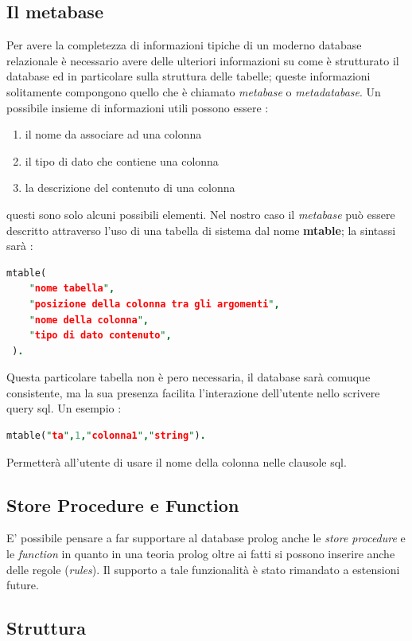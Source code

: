 \subsection{Il metabase}
Per avere la completezza di informazioni tipiche di un moderno database relazionale è necessario avere delle ulteriori informazioni su come è strutturato il database ed in particolare sulla struttura delle tabelle; queste informazioni solitamente compongono quello che è chiamato \emph{metabase} o \emph{metadatabase}. Un possibile insieme di informazioni utili possono essere : 
\begin{enumerate}
\item il nome da associare ad una colonna
\item il tipo di dato che contiene una colonna
\item la descrizione del contenuto di una colonna 
\end{enumerate}
questi sono solo alcuni possibili elementi. Nel nostro caso il \emph{metabase} può essere descritto attraverso l'uso di una tabella di sistema dal nome {\bf mtable}; la sintassi sarà : 
\begin{lstlisting}[language=Prolog,showstringspaces=false]
 mtable(
	"nome tabella",
	"posizione della colonna tra gli argomenti",
	"nome della colonna",
	"tipo di dato contenuto",
 ).
\end{lstlisting}
Questa particolare tabella non è pero necessaria, il database sarà comuque consistente, ma la sua presenza facilita l'interazione dell'utente nello scrivere query sql. Un esempio :
\begin{lstlisting}[language=Prolog,showstringspaces=false]
 mtable("ta",1,"colonna1","string").
\end{lstlisting}
Permetterà all'utente di usare il nome della colonna nelle clausole sql.

\subsection{Store Procedure e Function}
E' possibile pensare a far supportare al database prolog anche le \emph{store procedure} e le \emph{function}  in quanto in una teoria prolog oltre ai fatti si possono inserire anche delle regole (\emph{rules}). Il supporto a tale funzionalità è stato rimandato a estensioni future. 

\subsection{Struttura}


